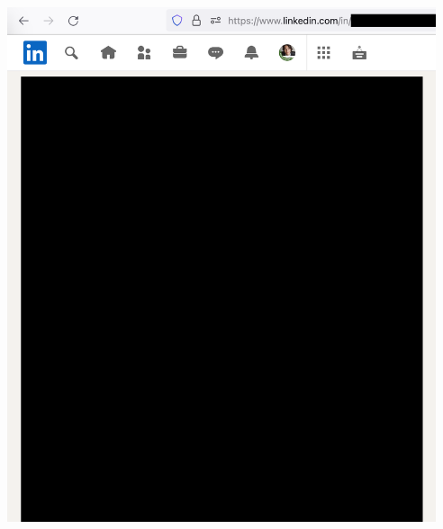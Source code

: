 
\begin{center}
    \includegraphics[width=34em]{php-two-linkedin-p1_public}
\end{center}
\WillContinue
\pagebreak

